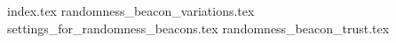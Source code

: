 {index.tex}
{randomness_beacon_variations.tex}
{settings_for_randomness_beacons.tex}
{randomness_beacon_trust.tex}

